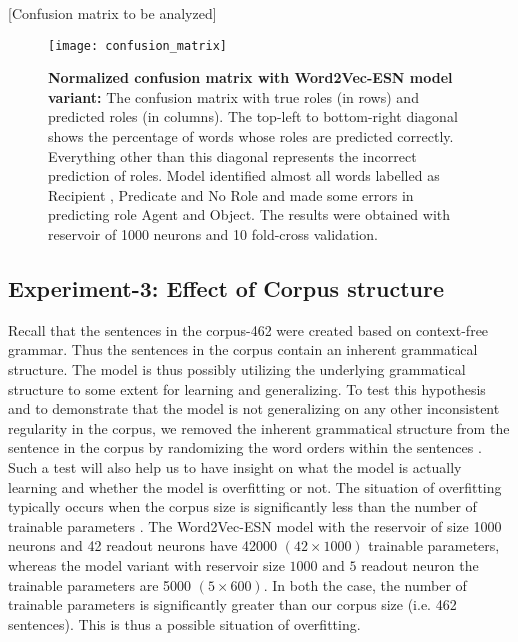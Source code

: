 [Confusion matrix to be analyzed]

\begin{figure}[hbtp]
\centering
\texttt{[image: confusion\_matrix]}
\caption[Normalized confusion matrix on corpus 462 with Word2Vec-ESN model variant] {\textbf{Normalized confusion matrix with Word2Vec-ESN model variant:} The confusion matrix with true roles (in rows) and predicted roles (in columns). The top-left to bottom-right diagonal shows the percentage of words whose roles are predicted correctly. Everything other than this diagonal represents the incorrect prediction of roles. Model identified almost all words labelled as Recipient , Predicate and No Role and made some errors in predicting role Agent and Object. The results were obtained with reservoir of 1000 neurons and 10 fold-cross validation.}
\label{fig:confusion_matrix}
\end{figure}


\subsection{Experiment-3: Effect of Corpus structure} 

Recall that the sentences in the corpus-462 were created based on context-free grammar. Thus the sentences in the corpus contain an inherent grammatical structure. The model is thus possibly utilizing the underlying grammatical structure to some extent for learning and generalizing. To test this hypothesis and to demonstrate that the model is not generalizing on any other inconsistent regularity in the corpus, we removed the inherent grammatical structure from the sentence in the corpus by randomizing the word orders within the sentences \cite{xavier:2013:RT}. Such a test will also help us to have insight on what the model is actually learning and whether the model is overfitting or not. The situation of overfitting typically occurs when the corpus size is significantly less than the number of trainable parameters \cite{xavier:2013:RT}. The Word2Vec-ESN model with the reservoir of size 1000 neurons and 42 readout neurons have 42000 $(42 \times 1000)$ trainable parameters, whereas the model variant with reservoir size $1000$ and $5$ readout neuron the trainable parameters are 5000 $(5 \times 600)$. In both the case, the number of trainable parameters is significantly greater than our corpus size (i.e. 462 sentences). This is thus a possible situation of overfitting.

